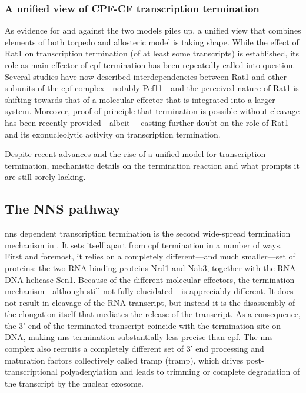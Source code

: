 \subsubsection{A unified view of CPF-CF transcription termination}

As evidence for and against the two models piles up, a unified view that combines elements of both torpedo and allosteric model is taking shape.
While the effect of Rat1 on transcription termination (of at least some transcripts) is established, its role as main effector of \gls{cpf} termination has been repeatedly called into question.
Several studies have now described interdependencies between Rat1 and other subunits of the \gls{cpf} complex---notably Pcf11---and the perceived nature of Rat1 is shifting towards that of a molecular effector  that is integrated into a larger system.
Moreover, proof of principle that termination is possible without cleavage has been recently provided---albeit \invitro{}---casting further doubt on the role of Rat1 and its exonucleolytic activity on transcription termination.

Despite recent advances and the rise of a unified model for transcription termination, mechanistic details on the termination reaction and what prompts it are still sorely lacking.



\subsection{The NNS pathway}

\gls{nns} dependent transcription termination is the second wide-spread termination mechanism in \cer{}.
It sets itself apart from \gls{cpf} termination in a number of ways.
First and foremost, it relies on a completely different---and much smaller---set of proteins: the two RNA binding proteins Nrd1 and Nab3, together with the RNA-DNA helicase Sen1.
Because of the different molecular effectors, the termination mechanism---although still not fully elucidated---is appreciably different.
It does not result in cleavage of the RNA transcript, but instead it is the disassembly of the elongation itself that mediates the release of the transcript. 
As a consequence, the 3' end of the terminated transcript coincide with the termination site on DNA, making \gls{nns} termination substantially less precise than \gls{cpf}.
The \gls{nns} complex also recruits a completely different set of 3' end processing and maturation factors collectively called \gls{tramp} (\glsdesc{tramp}), which drives post-transcriptional polyadenylation and leads to trimming or complete degradation of the transcript by the nuclear exosome. 

